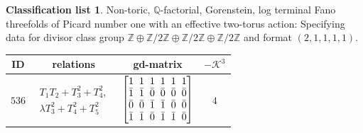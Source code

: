 \documentclass[pdftex]{sigma}%
\theoremstyle{definition}
\newtheorem{class-list}[thm]{Classification list}
\def\ZZ{{\mathbb Z}}
\def\QQ{{\mathbb Q}}
\numberwithin{equation}{section}
\begin{document}
\begin{class-list}
Non-toric, $\QQ$-factorial, Gorenstein, log terminal Fano
threefolds of Picard number one with an effective two-torus action:
Specifying data for divisor class group
$\ZZ\oplus \ZZ/2\ZZ\oplus \ZZ/2\ZZ\oplus \ZZ/2\ZZ$ and format $(2,1,1,1,1)$.
\begin{table}[h!]\centering\setlength{\tabcolsep}{5.5pt}
\renewcommand{\arraystretch}{1.1}\small\tabulinesep=1mm
\begin{tabu}{c|c|c|c}
\hline
ID&relations&gd-matrix&$-\mathcal{K}^3$
\\
\hline
${536}$&
$\begin{array}{r}{T_{1}T_{2}+T_{3}^{2}+T_{4}^{2}},\\ {\lambda T_{3}^{2}+T_{4}^{2}+T_{5}^{2}}\end{array}$
&$\arraycolsep=1mm\begin{bmatrix}{1} & {1} & {1} & {1} & {1} & {1} \\ {\bar{1}} & {\bar{1}} & {\bar{0}} & {\bar{0}} & {\bar{0}} & {\bar{0}} \\ {\bar{0}} & {\bar{0}} & {\bar{1}} & {\bar{1}} & {\bar{0}} & {\bar{0}} \\ {\bar{1}} & {\bar{1}} & {\bar{0}} & {\bar{1}} & {\bar{1}} & {\bar{0}}\end{bmatrix}$
&${4}$
\\
\hline
\end{tabu}\vspace{-2mm}
\end{table}
\end{class-list}
\end{document}
